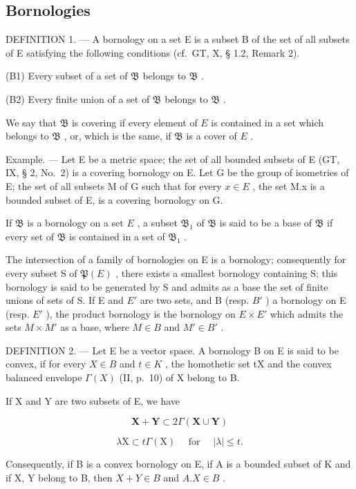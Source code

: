 \subsection{Bornologies}

DEFINITION 1. --- A bornology on a set E is a subset B of the set of all subsets of E satisfying the following conditions (cf.~GT, X, § 1.2, Remark 2).

(B1) Every subset of a set of \(\mathfrak{B}\) belongs to \(\mathfrak{B}\) .

(B2) Every finite union of a set of \(\mathfrak{B}\) belongs to \(\mathfrak{B}\) .

We say that \(\mathfrak{B}\) is covering if every element of \(E\) is contained in a set which belongs to \(\mathfrak{B}\) , or, which is the same, if \(\mathfrak{B}\) is a cover of \(E\) .

Example. --- Let E be a metric space; the set of all bounded subsets of E (GT, IX, § 2, No.~2) is a covering bornology on E. Let G be the group of isometries of E; the set of all subsets M of G such that for every \(x \in E\) , the set M.x is a bounded subset of E, is a covering bornology on G.

If \(\mathfrak{B}\) is a bornology on a set \(E\) , a subset \(\mathfrak{B}_1\) of \(\mathfrak{B}\) is said to be a base of \(\mathfrak{B}\) if every set of \(\mathfrak{B}\) is contained in a set of \(\mathfrak{B}_1\) .

The intersection of a family of bornologies on E is a bornology; consequently for every subset S of \(\mathfrak{P}(E)\) , there exists a smallest bornology containing S; this bornology is said to be generated by S and admits as a base the set of finite unions of sets of S. If E and \(E'\) are two sets, and B (resp. \(B'\) ) a bornology on E (resp. \(E'\) ), the product bornology is the bornology on \(E \times E'\) which admits the sets \(M \times M'\) as a base, where \(M \in B\) and \(M' \in B'\) .

DEFINITION 2. --- Let E be a vector space. A bornology B on E is said to be convex, if for every \(X \in B\) and \(t \in K\) , the homothetic set tX and the convex balanced envelope \(\Gamma(X)\) (II, p.~10) of X belong to B.

If X and Y are two subsets of E, we have

\[
\mathbf {X} + \mathbf {Y} \subset 2 \Gamma (\mathbf {X} \cup \mathbf {Y})
\]

\[
\lambda \mathrm{X} \subset t \Gamma (\mathrm{X}) \quad \text { for } \quad | \lambda | \leqslant t.
\]

Consequently, if B is a convex bornology on E, if A is a bounded subset of K and if X, Y belong to B, then \(X + Y \in B\) and \(A. X \in B\) .

